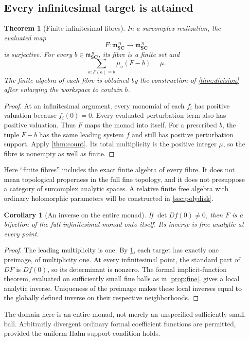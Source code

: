 \documentclass[11pt,letterpaper]{article}
\newtheorem{theorem}{Theorem}[section]
\newtheorem{corollary}[corollary]{Corollary}
\theoremstyle{definition}
\theoremstyle{remark}
\newcommand{\SC}{\mathbf{SC}}
\newcommand{\mm}{\mathfrak m}
\numberwithin{equation}{section}
\begin{document}
\subsection{Every infinitesimal target is attained}
\begin{theorem}[Finite infinitesimal fibres]\label{thm:fibres}
In a surcomplex realization, the evaluated map
\[
 F:\mm_{\SC}^{\,n}\longrightarrow\mm_{\SC}^{\,n}
\]
is surjective. For every $b\in\mm_{\SC}^{\,n}$, its fibre is a finite set and
\begin{equation}\label{eq:fibres}
 \sum_{a:F(a)=b}\mu_a(F-b)=\mu.
\end{equation}
The finite algebra of each fibre is obtained by the construction of \cref{thm:division} after enlarging the workspace to contain $b$.
\end{theorem}
\begin{proof}
At an infinitesimal argument, every monomial of each $f_i$ has positive valuation because $f_i(0)=0$. Every evaluated perturbation term also has positive valuation. Thus $F$ maps the monad into itself. For a prescribed $b$, the tuple $F-b$ has the same leading system $f$ and still has positive perturbation support. Apply \cref{thm:count}. Its total multiplicity is the positive integer $\mu$, so the fibre is nonempty as well as finite.
\end{proof}
Here ``finite fibres'' includes the exact finite algebra of every fibre. It does not mean topological properness in the full fine topology, and it does not presuppose a category of surcomplex analytic spaces. A relative finite free algebra with ordinary holomorphic parameters will be constructed in \cref{sec:polydisk}.

\begin{corollary}[An inverse on the entire monad]\label{cor:inverse}
If $\det Df(0)\ne0$, then $F$ is a bijection of the full infinitesimal monad onto itself. Its inverse is fine-analytic at every point.
\end{corollary}
\begin{proof}
The leading multiplicity is one. By \cref{thm:fibres}, each target has exactly one preimage, of multiplicity one. At every infinitesimal point, the standard part of $DF$ is $Df(0)$, so its determinant is nonzero. The formal implicit-function theorem, evaluated on sufficiently small fine balls as in \cref{prop:fine}, gives a local analytic inverse. Uniqueness of the preimage makes these local inverses equal to the globally defined inverse on their respective neighborhoods.
\end{proof}
The domain here is an entire monad, not merely an unspecified sufficiently small ball. Arbitrarily divergent ordinary formal coefficient functions are permitted, provided the uniform Hahn support condition holds.
\end{document}
